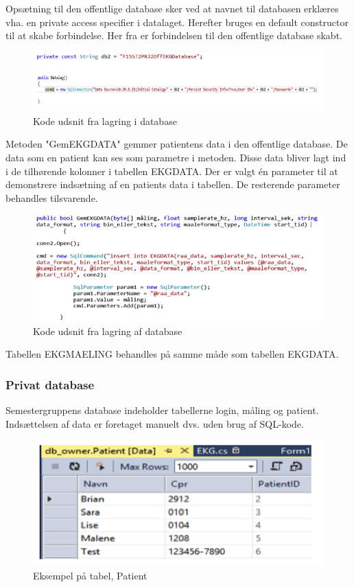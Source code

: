 Opsætning til den offentlige database sker ved at navnet til databasen erklæres vha. en private access specifier i datalaget. Herefter bruges en default constructor til at skabe forbindelse. Her fra er forbindelsen til den offentlige database skabt. 

\begin{figure}[H]
	\centering
	\includegraphics[width=1\textwidth]{Figurer/Snip20150525_32}	
	\caption{Kode udsnit fra lagring i database}
\end{figure}

Metoden "GemEKGDATA" gemmer patientens data i den offentlige database. De data som en patient kan ses som parametre i metoden. Disse data bliver lagt ind i de tilhørende kolonner i tabellen EKGDATA. Der er valgt én parameter til at demonstrere indsætning af en patients data i tabellen. De resterende parameter behandles tilsvarende. 

\begin{figure}[H]
	\centering
	\includegraphics[width=1\textwidth]{Figurer/Snip20150525_33}
	\caption{Kode udsnit fra lagring af database}
\end{figure}

Tabellen EKGMAELING behandles på samme måde som tabellen EKGDATA. 

\subsubsection{Privat database}
Semestergruppens database indeholder tabellerne login, måling og patient. Indsættelsen af data er foretaget manuelt dvs. uden brug af SQL-kode. 

\begin{figure}[H]
	\centering
	\includegraphics[width=1\textwidth]{Figurer/Snip20150525_34}
	\caption{Eksempel på tabel, Patient}
\end{figure}

